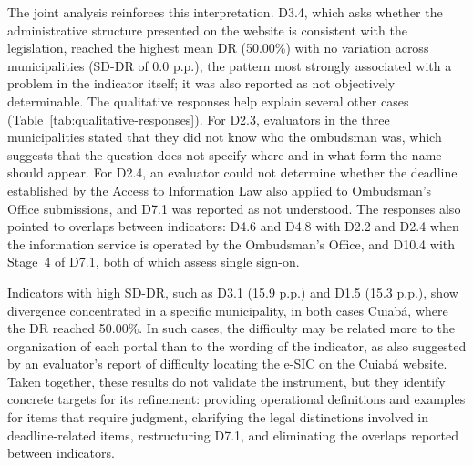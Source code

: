 \documentclass[12pt]{article}
\begin{document}
The joint analysis reinforces this interpretation. D3.4, which asks whether the administrative structure presented on the website is consistent with the legislation, reached the highest mean DR (50.00\%) with no variation across municipalities (SD-DR of 0.0 p.p.), the pattern most strongly associated with a problem in the indicator itself; it was also reported as not objectively determinable. The qualitative responses help explain several other cases (Table~\ref{tab:qualitative-responses}). For D2.3, evaluators in the three municipalities stated that they did not know who the ombudsman was, which suggests that the question does not specify where and in what form the name should appear. For D2.4, an evaluator could not determine whether the deadline established by the Access to Information Law also applied to Ombudsman's Office submissions, and D7.1 was reported as not understood. The responses also pointed to overlaps between indicators: D4.6 and D4.8 with D2.2 and D2.4 when the information service is operated by the Ombudsman's Office, and D10.4 with Stage~4 of D7.1, both of which assess single sign-on.

Indicators with high SD-DR, such as D3.1 (15.9 p.p.) and D1.5 (15.3 p.p.), show divergence concentrated in a specific municipality, in both cases Cuiabá, where the DR reached 50.00\%. In such cases, the difficulty may be related more to the organization of each portal than to the wording of the indicator, as also suggested by an evaluator's report of difficulty locating the e-SIC on the Cuiabá website. Taken together, these results do not validate the instrument, but they identify concrete targets for its refinement: providing operational definitions and examples for items that require judgment, clarifying the legal distinctions involved in deadline-related items, restructuring D7.1, and eliminating the overlaps reported between indicators.
\end{document}

